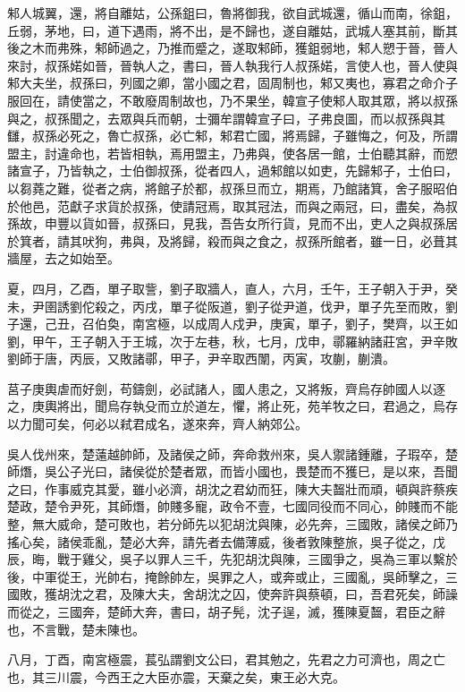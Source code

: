 \begin{pinyinscope}
邾人城翼，還，將自離姑，公孫鉏曰，魯將御我，欲自武城還，循山而南，徐鉏，丘弱，茅地，曰，道下遇雨，將不出，是不歸也，遂自離姑，武城人塞其前，斷其後之木而弗殊，邾師過之，乃推而蹙之，遂取邾師，獲鉏弱地，邾人愬于晉，晉人來討，叔孫婼如晉，晉執人之，書曰，晉人執我行人叔孫婼，言使人也，晉人使與邾大夫坐，叔孫曰，列國之卿，當小國之君，固周制也，邾又夷也，寡君之命介子服回在，請使當之，不敢廢周制故也，乃不果坐，韓宣子使邾人取其眾，將以叔孫與之，叔孫聞之，去眾與兵而朝，士彌牟謂韓宣子曰，子弗良圖，而以叔孫與其讎，叔孫必死之，魯亡叔孫，必亡邾，邾君亡國，將焉歸，子雖悔之，何及，所謂盟主，討違命也，若皆相執，焉用盟主，乃弗與，使各居一館，士伯聽其辭，而愬諸宣子，乃皆執之，士伯御叔孫，從者四人，過邾館以如吏，先歸邾子，士伯曰，以芻蕘之難，從者之病，將館子於都，叔孫旦而立，期焉，乃館諸箕，舍子服昭伯於他邑，范獻子求貨於叔孫，使請冠焉，取其冠法，而與之兩冠，曰，盡矣，為叔孫故，申豐以貨如晉，叔孫曰，見我，吾告女所行貨，見而不出，吏人之與叔孫居於箕者，請其吠狗，弗與，及將歸，殺而與之食之，叔孫所館者，雖一日，必葺其牆屋，去之如始至。

夏，四月，乙酉，單子取訾，劉子取牆人，直人，六月，壬午，王子朝入于尹，癸未，尹圉誘劉佗殺之，丙戌，單子從阪道，劉子從尹道，伐尹，單子先至而敗，劉子還，己丑，召伯奐，南宮極，以成周人戍尹，庚寅，單子，劉子，樊齊，以王如劉，甲午，王子朝入于王城，次于左巷，秋，七月，戊申，鄩羅納諸莊宮，尹辛敗劉師于唐，丙辰，又敗諸鄩，甲子，尹辛取西闈，丙寅，攻蒯，蒯潰。

莒子庚輿虐而好劍，苟鑄劍，必試諸人，國人患之，又將叛，齊烏存帥國人以逐之，庚輿將出，聞烏存執殳而立於道左，懼，將止死，苑羊牧之曰，君過之，烏存以力聞可矣，何必以弒君成名，遂來奔，齊人納郊公。

吳人伐州來，楚薳越帥師，及諸侯之師，奔命救州來，吳人禦諸鍾離，子瑕卒，楚師熸，吳公子光曰，諸侯從於楚者眾，而皆小國也，畏楚而不獲巳，是以來，吾聞之曰，作事威克其愛，雖小必濟，胡沈之君幼而狂，陳大夫齧壯而頑，頓與許蔡疾楚政，楚令尹死，其師熸，帥賤多寵，政令不壹，七國同役而不同心，帥賤而不能整，無大威命，楚可敗也，若分師先以犯胡沈與陳，必先奔，三國敗，諸侯之師乃搖心矣，諸侯乖亂，楚必大奔，請先者去備薄威，後者敦陳整旅，吳子從之，戊辰，晦，戰于雞父，吳子以罪人三千，先犯胡沈與陳，三國爭之，吳為三軍以繫於後，中軍從王，光帥右，掩餘帥左，吳罪之人，或奔或止，三國亂，吳師擊之，三國敗，獲胡沈之君，及陳大夫，舍胡沈之囚，使奔許與蔡頓，曰，吾君死矣，師譟而從之，三國奔，楚師大奔，書曰，胡子髡，沈子逞，滅，獲陳夏齧，君臣之辭也，不言戰，楚未陳也。

八月，丁酉，南宮極震，萇弘謂劉文公曰，君其勉之，先君之力可濟也，周之亡也，其三川震，今西王之大臣亦震，天棄之矣，東王必大克。


\end{pinyinscope}
